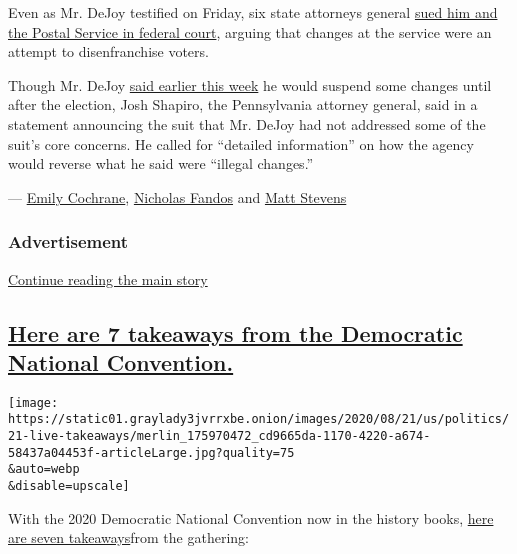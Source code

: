 Even as Mr. DeJoy testified on Friday, six state attorneys general
\href{https://www.nytimes3xbfgragh.onion/live/2020/08/21/us/dnc-convention-election/states-file-a-joint-lawsuit-over-changes-to-post-office-operations}{sued
him and the Postal Service in federal court}, arguing that changes at
the service were an attempt to disenfranchise voters.

Though Mr. DeJoy
\href{https://www.nytimes3xbfgragh.onion/2020/08/18/us/politics/postal-service-suspends-changes.html}{said
earlier this week} he would suspend some changes until after the
election, Josh Shapiro, the Pennsylvania attorney general, said in a
statement announcing the suit that Mr. DeJoy had not addressed some of
the suit's core concerns. He called for ``detailed information'' on how
the agency would reverse what he said were ``illegal changes.''

--- \href{https://www.nytimes3xbfgragh.onion/by/emily-cochrane}{Emily
Cochrane},
\href{https://www.nytimes3xbfgragh.onion/by/nicholas-fandos}{Nicholas
Fandos} and
\href{https://www.nytimes3xbfgragh.onion/by/matt-stevens}{Matt Stevens}

\hypertarget{advertisement}{%
\subsubsection{Advertisement}\label{advertisement}}

\protect\hyperlink{after-dfp-ad-mid1}{Continue reading the main story}

\hypertarget{here-are-7-takeaways-from-the-democratic-national-convention}{%
\subsection{\texorpdfstring{\protect\hyperlink{here-are-7-takeaways-from-the-democratic-national-convention}{Here
are 7 takeaways from the Democratic National
Convention.}}{Here are 7 takeaways from the Democratic National Convention.}}\label{here-are-7-takeaways-from-the-democratic-national-convention}}

\texttt{[image: https://static01.graylady3jvrrxbe.onion/images/2020/08/21/us/politics/21-live-takeaways/merlin\_175970472\_cd9665da-1170-4220-a674-58437a04453f-articleLarge.jpg?quality=75\\\&auto=webp\\\&disable=upscale]}

With the 2020 Democratic National Convention now in the history books,
\href{https://www.nytimes3xbfgragh.onion/2020/08/21/us/politics/dnc-takeaways-biden-obama.html}{here
are seven takeaways}from the gathering:

